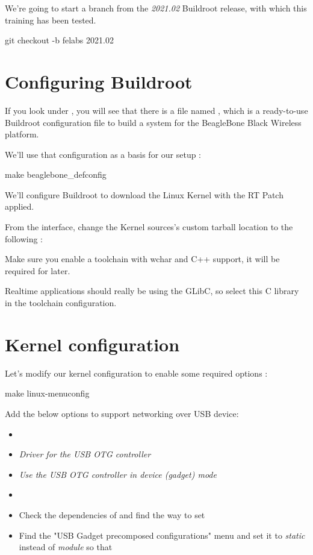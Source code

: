 We're going to start a branch from the {\em 2021.02} Buildroot
release, with which this training has been tested.

\begin{bashinput}
git checkout -b felabs 2021.02
\end{bashinput}

\section{Configuring Buildroot}

If you look under , you will see that there is a file
named , which is a ready-to-use Buildroot
configuration file to build a system for the BeagleBone Black Wireless
platform.

We'll use that configuration as a basis for our setup :

\begin{bashinput}
make beaglebone_defconfig
\end{bashinput}

We'll configure Buildroot to download the Linux Kernel with the RT Patch applied.

From the  interface, change the Kernel sources's custom
tarball location to the following :


Make sure you enable a toolchain with wchar and C++ support, it will be required
for later.

Realtime applications should really be using the GLibC, so select this C library in the
toolchain configuration.

\section{Kernel configuration}

Let's modify our kernel configuration to enable some required options :

\begin{bashinput}
	make linux-menuconfig
\end{bashinput}

Add the below options to support networking over USB device:
\begin{itemize}
  \item {}
  \item {} {\em Driver for the USB OTG
        controller}
  \item {} {\em Use the USB OTG controller
	in device (gadget) mode}
  \item {}
  \item Check the dependencies of 
        and find the way to set 
  \item Find the "USB Gadget precomposed configurations" menu
        and set it to {\em static} instead of {\em module}
	so that 
\end{itemize}


